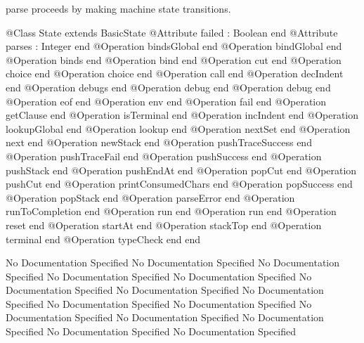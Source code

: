        parse proceeds by making machine state transitions.
\begin{Interface}
@Class State extends BasicState
  @Attribute failed : Boolean end
  @Attribute parses : Integer end
  @Operation bindsGlobal end
  @Operation bindGlobal end
  @Operation binds end
  @Operation bind end
  @Operation cut end
  @Operation choice end
  @Operation choice end
  @Operation call end
  @Operation decIndent end
  @Operation debugs end
  @Operation debug end
  @Operation debug end
  @Operation eof end
  @Operation env end
  @Operation fail end
  @Operation getClause end
  @Operation isTerminal end
  @Operation incIndent end
  @Operation lookupGlobal end
  @Operation lookup end
  @Operation nextSet end
  @Operation next end
  @Operation newStack end
  @Operation pushTraceSuccess end
  @Operation pushTraceFail end
  @Operation pushSuccess end
  @Operation pushStack end
  @Operation pushEndAt end
  @Operation popCut end
  @Operation pushCut end
  @Operation printConsumedChars end
  @Operation popSuccess end
  @Operation popStack end
  @Operation parseError end
  @Operation runToCompletion end
  @Operation run end
  @Operation run end
  @Operation reset end
  @Operation startAt end
  @Operation stackTop end
  @Operation terminal end
  @Operation typeCheck end
end
\end{Interface}
No Documentation Specified
No Documentation Specified
No Documentation Specified
No Documentation Specified
No Documentation Specified
No Documentation Specified
No Documentation Specified
No Documentation Specified
No Documentation Specified
No Documentation Specified
No Documentation Specified
No Documentation Specified
No Documentation Specified
No Documentation Specified
No Documentation Specified
